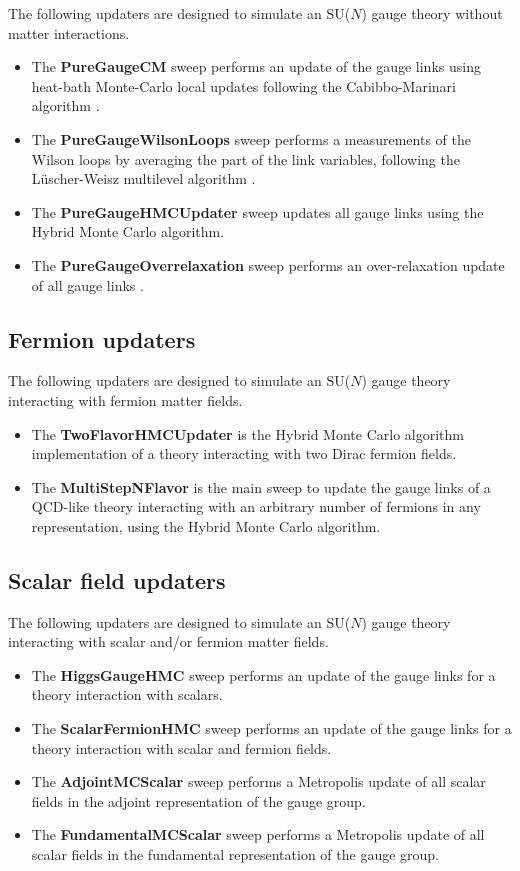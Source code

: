\documentclass[11pt,a4paper]{article}
\begin{document}
The following updaters are designed to simulate an SU($N$) gauge theory without matter interactions.

\begin{itemize}
\item The \textbf{PureGaugeCM} sweep performs an update of the gauge links using heat-bath Monte-Carlo local updates following the Cabibbo-Marinari algorithm \cite{CAB82}.
\item The \textbf{PureGaugeWilsonLoops} sweep performs a measurements of the Wilson loops by averaging the part of the link variables, following the L\"uscher-Weisz multilevel algorithm \cite{LUS01}.
\item The \textbf{PureGaugeHMCUpdater} sweep updates all gauge links using the Hybrid Monte Carlo algorithm.
\item The \textbf{PureGaugeOverrelaxation} sweep performs an over-relaxation update of all gauge links \cite{CRE87}.
\end{itemize}

\subsection{Fermion updaters}

The following updaters are designed to simulate an SU($N$) gauge theory interacting with fermion matter fields.

\begin{itemize}
\item The \textbf{TwoFlavorHMCUpdater} is the Hybrid Monte Carlo algorithm implementation of a theory interacting with two Dirac fermion fields.
\item The \textbf{MultiStepNFlavor} is the main sweep to update the gauge links of a QCD-like theory interacting with an arbitrary number of fermions in any representation, using the Hybrid Monte Carlo algorithm.
\end{itemize}

\subsection{Scalar field updaters}

The following updaters are designed to simulate an SU($N$) gauge theory interacting with scalar and/or fermion matter fields.

\begin{itemize}
\item The \textbf{HiggsGaugeHMC} sweep performs an update of the gauge links for a theory interaction with scalars.
\item The \textbf{ScalarFermionHMC} sweep performs an update of the gauge links for a theory interaction with scalar and fermion fields.
\item The \textbf{AdjointMCScalar} sweep performs a Metropolis update of all scalar fields in the adjoint representation of the gauge group.
\item The \textbf{FundamentalMCScalar} sweep performs a Metropolis update of all scalar fields in the fundamental representation of the gauge group.
\end{itemize}
\end{document}
